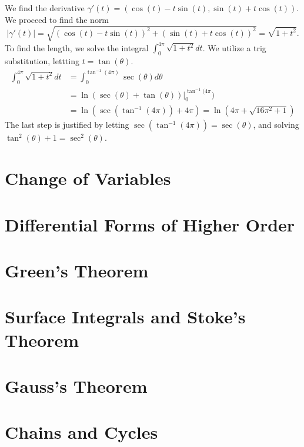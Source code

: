 \documentclass[12pt]{book}
\newenvironment{exercise}[2][Exercise]{\begin{trivlist}
\item[\hskip \labelsep {\bfseries #1}\hskip \labelsep {\bfseries #2.}]}{\end{trivlist}}
\begin{document}
\begin{exercise}{11.1.2}
    We find the derivative $\gamma ' (t) = \left( \cos(t)-t \sin(t), \sin(t) + t \cos(t) \right)$. We proceed to find the norm
    \[ \left| \gamma'(t) \right| = \sqrt{ \left( \cos(t) - t \sin(t)\right)^2 + \left( \sin(t) + t \cos(t) \right)^2 } = \sqrt{1+t^2}. \]
    To find the length, we solve the integral $\int_0^{4 \pi} \sqrt{1+t^2} dt$. We utilize a trig substitution, lettting $t = \tan(\theta)$. 
    \begin{align*}
        \int_0^{4 \pi} \sqrt{1+t^2} dt &= \int_0^{\tan^{-1}(4 \pi)} \sec(\theta) d\theta \\
                                       &= \left. \ln \left( \sec(\theta) + \tan(\theta) \right) \right|_0^{\tan^{-1}(4 \pi}) \\
                                       &= \ln \left( \sec\left( \tan^{-1}(4 \pi)\right) + 4 \pi \right) = \ln \left( 4 \pi + \sqrt{16 \pi^2 +1 }\right)
    \end{align*}
    The last step is justified by letting $\sec\left( \tan^{-1}(4 \pi)\right)= \sec (\theta)$, and solving $\tan^2 (\theta) + 1 = \sec^2(\theta)$.
\end{exercise}

\section{Change of Variables}


\section{Differential Forms of Higher Order}


\section{Green's Theorem}


\section{Surface Integrals and Stoke's Theorem}


\section{Gauss's Theorem}



\section{Chains and Cycles}




\end{document}
